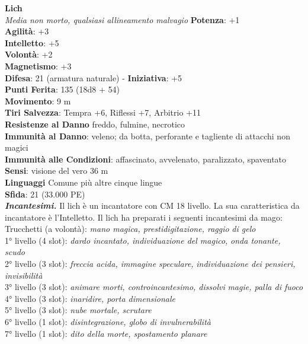 \begin{multicols}{2}
\medskip\textbf{Lich}\\
\emph{Media non morto, qualsiasi allineamento malvagio}
\textbf{Potenza}: +1\\
\textbf{Agilità}: +3\\
\textbf{Intelletto}: +5\\
\textbf{Volontà}: +2\\
\textbf{Magnetismo}: +3\\
\textbf{Difesa}: 21 (armatura naturale) - \textbf{Iniziativa}: +5\\
\textbf{Punti Ferita}: 135 (18d8 + 54)\\
\textbf{Movimento}: 9 m\\
\textbf{Tiri Salvezza}: Tempra +6, Riflessi +7, Arbitrio +11\\
\textbf{Resistenze al Danno} freddo, fulmine, necrotico\\
\textbf{Immunità al Danno}: veleno; da botta, perforante e tagliente di attacchi non magici\\
\textbf{Immunità alle Condizioni}: affascinato, avvelenato, paralizzato, spaventato\\
\textbf{Sensi}: visione del vero 36 m\\
\textbf{Linguaggi} Comune più altre cinque lingue\\
\textbf{Sfida}: 21 (33.000 PE)\smallskip\\
\emph{\textbf{Incantesimi.}} Il lich è un incantatore con CM 18 livello. La sua caratteristica da incantatore è l'Intelletto. Il lich ha preparati i seguenti incantesimi da mago:\\
Trucchetti (a volontà): \emph{mano magica, prestidigitazione, raggio} \emph{di gelo}\\
1° livello (4 slot): \emph{dardo incantato, individuazione del magico,} \emph{onda tonante, scudo}\\
2° livello (3 slot): \emph{freccia acida, immagine speculare,} \emph{individuazione dei pensieri, invisibilità}\\
3° livello (3 slot): \emph{animare morti, controincantesimo, dissolvi} \emph{magie, palla di fuoco}\\
4° livello (3 slot): \emph{inaridire, porta dimensionale}\\
5° livello (3 slot): \emph{nube mortale, scrutare}\\
6° livello (1 slot): \emph{disintegrazione, globo di invulnerabilità}\\
7° livello (1 slot): \emph{dito della morte, spostamento planare}\\

\end{multicols}
